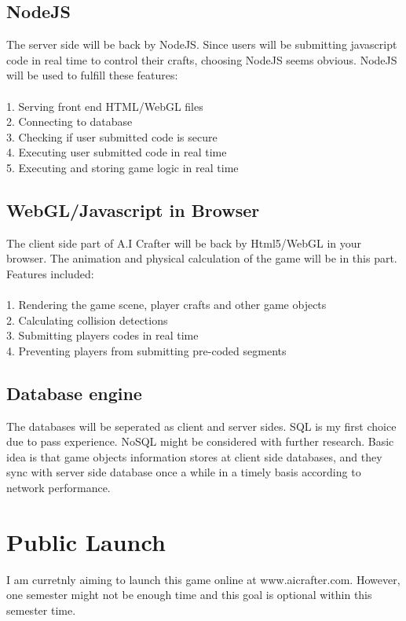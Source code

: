 \documentclass[12pt]{article}
\begin{document}
\subsection{NodeJS}
The server side will be back by NodeJS. Since users will be submitting javascript code in real time to control their crafts, choosing NodeJS seems obvious. NodeJS will be used to fulfill these features:\\
\\
1. Serving front end HTML/WebGL files\\
2. Connecting to database\\
3. Checking if user submitted code is secure\\
4. Executing user submitted code in real time\\
5. Executing and storing game logic in real time\\

\subsection{WebGL/Javascript in Browser}
The client side part of A.I Crafter will be back by Html5/WebGL in your browser.
The animation and physical calculation of the game will be in this part. Features included:\\
\\
1. Rendering the game scene, player crafts and other game objects\\
2. Calculating collision detections\\
3. Submitting players codes in real time\\
4. Preventing players from submitting pre-coded segments\\

\subsection{Database engine}
The databases will be seperated as client and server sides. SQL is my first choice due to pass experience. NoSQL might be considered with further research. Basic idea is that game objects information stores at client side databases, and they sync with server side database once a while in a timely basis according to network performance.

\section{Public Launch}
I am curretnly aiming to launch this game online at www.aicrafter.com. However, one semester might not be enough time and this goal is optional within this semester time.
\end{document}
